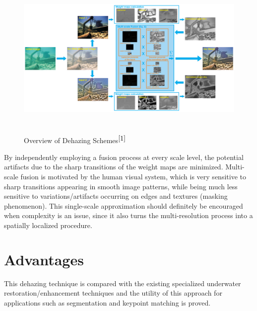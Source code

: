 \documentclass[hidelinks, 12pt]{report}
\begin{document}
\begin{figure}[H]
\centering
\includegraphics[width=16cm,height=8cm]{Dehaze.png}
\caption[Overview of Dehazing Schemes]{Overview of Dehazing Schemes$^{\cite{1}}$}
\label{Dehazing}
\end{figure}
By independently employing a fusion process at every scale level, the potential artifacts due to the sharp transitions of the weight maps are minimized. Multi-scale fusion is motivated by the human visual system, which is very sensitive to sharp transitions appearing in smooth image patterns, while being much less sensitive to variations/artifacts occurring on edges and textures (masking phenomenon). This single-scale approximation should definitely be encouraged when complexity is an issue, since it also turns the multi-resolution process into a spatially localized procedure.

\chapter{Advantages}
This dehazing technique is compared with the existing specialized underwater restoration/enhancement techniques and the utility of this approach for applications such as segmentation and keypoint matching is proved.
\end{document}

